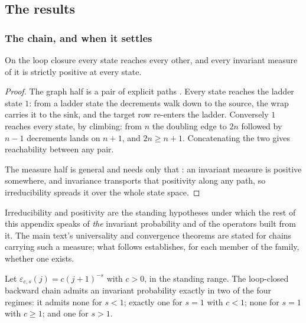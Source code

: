 \subsection{The results}\label{sec:doubling_results}


\subsubsection{The chain, and when it settles}


\begin{theorem}
  \label{thm:main_irreducible}
On the loop closure every state reaches every other, and every invariant measure of it is
strictly positive at every state.
\end{theorem}

\begin{proof}
The graph half is a pair of explicit paths . Every state
reaches the ladder state $1$: from a ladder state the decrements walk down to the source, the
wrap carries it to the sink, and the target row re-enters the ladder. Conversely $1$ reaches
every state, by climbing: from $n$ the doubling edge to $2n$ followed by $n-1$ decrements lands
on $n+1$, and $2n\geq n+1$. Concatenating the two gives reachability between any pair.

The measure half is general and needs only that :
an invariant measure is positive somewhere, and invariance transports that positivity along any
path, so irreducibility spreads it over the whole state space.
\end{proof}

\noindent Irreducibility and positivity are the standing hypotheses under which the rest of this appendix
speaks of \emph{the} invariant probability and of the operators built from it. The main text's
universality and convergence theorems are stated for chains carrying such a measure; what
follows establishes, for each member of the family, whether one exists.


\begin{theorem}
  \label{thm:main_phase}
Let $\varepsilon_{c,s}(j)=c(j+1)^{-s}$ with $c>0$, in the standing range. The loop-closed
backward chain admits an invariant probability exactly in two of the four regimes: it admits
none for $s<1$; exactly one for $s=1$ with $c<1$; none for $s=1$ with $c\geq1$; and one for
$s>1$.
\end{theorem}

